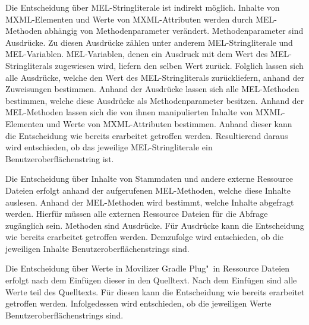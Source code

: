 Die Entscheidung über \ac{MEL}-Stringliterale ist indirekt möglich. Inhalte von \ac{MXML}-Elementen und Werte von \ac{MXML}-Attributen werden durch \ac{MEL}-Methoden abhängig von Methodenparameter verändert. Methodenparameter sind Ausdrücke. Zu diesen Ausdrücke zählen unter anderem \ac{MEL}-Stringliterale und \ac{MEL}-Variablen. \ac{MEL}-Variablen, denen ein Ausdruck mit dem Wert des \ac{MEL}-Stringliterals zugewiesen wird, liefern den selben Wert zurück. Folglich lassen sich alle Ausdrücke, welche den Wert des \ac{MEL}-Stringliterals zurückliefern, anhand der Zuweisungen bestimmen. Anhand der Ausdrücke lassen sich alle \ac{MEL}-Methoden bestimmen, welche diese Ausdrücke als Methodenparameter besitzen. Anhand der \ac{MEL}-Methoden lassen sich die von ihnen manipulierten Inhalte von \ac{MXML}-Elementen und Werte von \ac{MXML}-Attributen bestimmen. Anhand dieser kann die Entscheidung wie bereits erarbeitet getroffen werden. Resultierend daraus wird entschieden, ob das jeweilige \ac{MEL}-Stringliterale ein Benutzeroberflächenstring ist.
\par
Die Entscheidung über Inhalte von Stammdaten und andere externe Ressource Dateien erfolgt anhand der aufgerufenen \ac{MEL}-Methoden, welche diese Inhalte auslesen. Anhand der \ac{MEL}-Methoden wird bestimmt, welche Inhalte abgefragt werden. Hierfür müssen alle externen Ressource Dateien für die Abfrage zugänglich sein. Methoden sind Ausdrücke. Für Ausdrücke kann die Entscheidung wie bereits erarbeitet getroffen werden. Demzufolge wird entschieden, ob die jeweiligen Inhalte Benutzeroberflächenstrings sind.
\par
Die Entscheidung über Werte in Movilizer Gradle Plug"~in Ressource Dateien erfolgt nach dem Einfügen dieser in den Quelltext. Nach dem Einfügen sind alle Werte teil des Quelltexts. Für diesen kann die Entscheidung wie bereits erarbeitet getroffen werden. Infolgedessen wird entschieden, ob die jeweiligen Werte Benutzeroberflächenstrings sind.
\par
